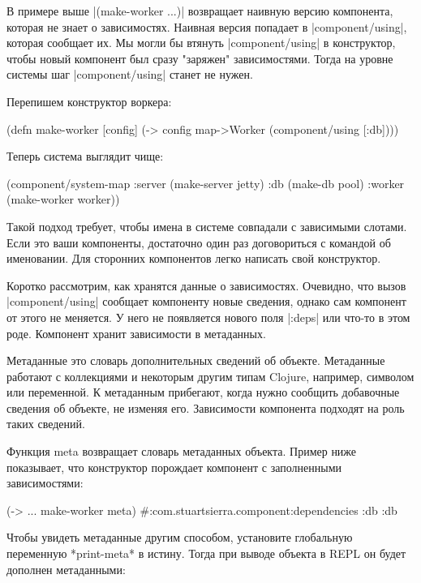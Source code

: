 В примере выше \spverb|(make-worker {...})| возвращает наивную версию компонента,
которая не знает о зависимостях. Наивная версия попадает в \spverb|component/using|,
которая сообщает их. Мы могли бы втянуть \spverb|component/using| в конструктор, чтобы
новый компонент был сразу "заряжен" зависимостями. Тогда на уровне системы шаг
\spverb|component/using| станет не нужен.

Перепишем конструктор воркера:

\begin{code}
(defn make-worker [config]
  (-> config
      map->Worker
      (component/using [:db])))
\end{code}

Теперь система выглядит чище:

\begin{code}
(component/system-map
 :server (make-server jetty)
 :db     (make-db pool)
 :worker (make-worker worker))
\end{code}

Такой подход требует, чтобы имена в системе совпадали с зависимыми слотами. Если
это ваши компоненты, достаточно один раз договориться с командой об
именовании. Для сторонних компонентов легко написать свой конструктор.

Коротко рассмотрим, как хранятся данные о зависимостях. Очевидно, что вызов
\spverb|component/using| сообщает компоненту новые сведения, однако сам компонент от
этого не меняется. У него не появляется нового поля \spverb|:deps| или что-то в этом
роде. Компонент хранит зависимости в метаданных.

Метаданные это словарь дополнительных сведений об объекте. Метаданные работают с
коллекциями и некоторым другим типам Clojure, например, символом или
переменной. К метаданным прибегают, когда нужно сообщить добавочные сведения об
объекте, не изменяя его. Зависимости компонента подходят на роль таких сведений.

Функция meta возвращает словарь метаданных объекта. Пример ниже показывает, что
конструктор порождает компонент с заполненными зависимостями:

\begin{code}
(-> {...} make-worker meta)
#:com.stuartsierra.component{:dependencies {:db :db}}
\end{code}

Чтобы увидеть метаданные другим способом, установите глобальную переменную
*print-meta* в истину. Тогда при выводе объекта в REPL он будет дополнен
метаданными:

